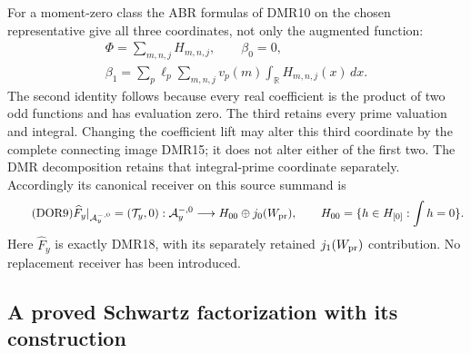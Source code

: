 For a moment-zero class the ABR formulas of DMR10 on the chosen
representative give all three coordinates, not only the augmented
function:
\begin{equation}\tag{DOR8}
\begin{gathered}
\Phi=\sum_{m,n,j}H_{m,n,j},\qquad \beta_0=0,\\
\beta_1=\sum_p\ell_p\sum_{m,n,j}v_p(m)
                              \int_{\mathbb R}H_{m,n,j}(x)\,dx.
\end{gathered}
\end{equation}
The second identity follows because every real coefficient is the
product of two odd functions and has evaluation zero. The third
retains every prime valuation and integral. Changing the coefficient
lift may alter this third coordinate by the complete connecting
image DMR15; it does not alter either of the first two. The DMR
decomposition retains that integral-prime coordinate separately.
Accordingly its canonical receiver on this source summand is
\begin{equation}\tag{DOR9}
\widehat F_y|_{\mathcal A_y^{-,0}}=(\mathcal T_y,0)
  :\mathcal A_y^{-,0}\longrightarrow H_{00}\oplus j_0(W_{\rm pr}),
\qquad
H_{00}=\{h\in H_{[0]}:\int h=0\}.
\end{equation}
Here $\widehat F_y$ is exactly DMR18, with its separately retained
$j_1(W_{\rm pr})$ contribution. No replacement receiver has been
introduced.

\subsection{A proved Schwartz factorization with its construction}

